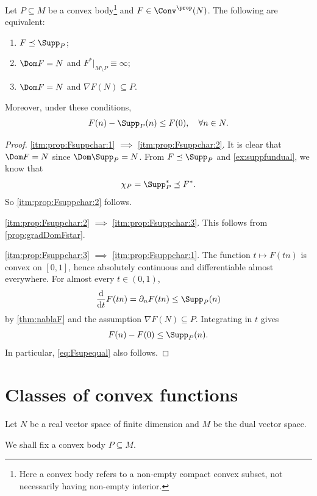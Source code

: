 \begin{proposition}\label{prop:Fsuppchar}
    Let $P\subseteq M$ be a convex body\footnote{Here a convex body refers to a non-empty compact convex subset, not necessarily having non-empty interior.} and $F\in \Conv^{\prop}(N)$. The following are equivalent:
    \begin{enumerate}
        \item\label{itm:prop:Fsuppchar:1} $F\preceq \Supp_P$;
        \item\label{itm:prop:Fsuppchar:2} $\Dom F=N$ and $F^*|_{M\setminus P}\equiv \infty$;
        \item\label{itm:prop:Fsuppchar:3} $\Dom F=N$ and $\nabla F(N)\subseteq P$.
    \end{enumerate}
    Moreover, under these conditions,
    \begin{equation}\label{eq:Fsupequal}
    F(n)-\Supp_P(n)\leq F(0),\quad \forall n\in N.
    \end{equation}
\end{proposition}
\begin{proof}
    \ref{itm:prop:Fsuppchar:1} $\implies$ \ref{itm:prop:Fsuppchar:2}. It is clear that $\Dom F=N$ since $\Dom \Supp_P=N$.
    From $F\preceq \Supp_P$ and \cref{ex:suppfundual}, we know that
    \[
    \chi_P=\Supp_P^*\preceq F^*.
    \]
    So \ref{itm:prop:Fsuppchar:2} follows.

    \ref{itm:prop:Fsuppchar:2} $\implies$ \ref{itm:prop:Fsuppchar:3}. This follows from \cref{prop:gradDomFstar}.

    \ref{itm:prop:Fsuppchar:3} $\implies$ \ref{itm:prop:Fsuppchar:1}. The function $t\mapsto F(tn)$ is convex on $[0,1]$, hence absolutely continuous and differentiable almost everywhere. For almost every $t\in(0,1)$,
    \[
        \frac{\mathrm d}{\mathrm dt}F(tn)=\partial_n F(tn) \leq \Supp_P(n)
    \]
    by \cref{thm:nablaF} and the assumption $\nabla F(N)\subseteq P$. Integrating in $t$ gives
    \[
        F(n)-F(0)\leq \Supp_P(n).
    \]
    In particular, \eqref{eq:Fsupequal} also follows.
\end{proof}


\section{Classes of convex functions}
\label{sec:convex_classes}
Let $N$ be a real vector space of finite dimension and $M$ be the dual vector space.

We shall fix a convex body $P\subseteq M$.



